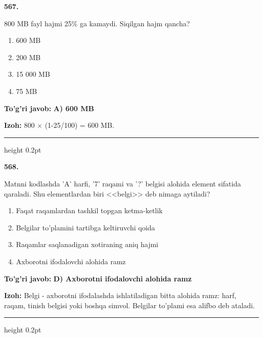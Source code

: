 \documentclass[10pt,a4paper,oneside]{article}
\begin{document}
\noindent\textbf{\color{ink}567.}
\par
800 MB fayl hajmi 25\% ga kamaydi. Siqilgan hajm qancha?
\begin{enumerate}[label=\Alph*),leftmargin=9mm]
\item 600 MB
\item 200 MB
\item 15 000 MB
\item 75 MB
\end{enumerate}
\begin{tcolorbox}[enhanced,breakable,colback=teal!4,colframe=teal!50!black,boxrule=0.5pt,arc=1.1mm,left=3mm,right=3mm,top=1.7mm,bottom=1.7mm,before skip=2mm,after skip=2mm]
\textbf{\color{teal}To'g'ri javob:} \textbf{A) 600 MB}
\par\smallskip
\textbf{Izoh:} 800 \ensuremath{\times} (1-25/100) = 600 MB.
\end{tcolorbox}
\vspace{2mm}\hrule height 0.2pt \vspace{3mm}

\noindent\textbf{\color{ink}568.}
\par
Matnni kodlashda 'A' harfi, '7' raqami va '?' belgisi alohida element sifatida qaraladi. Shu elementlardan biri <<belgi>> deb nimaga aytiladi?
\begin{enumerate}[label=\Alph*),leftmargin=9mm]
\item Faqat raqamlardan tashkil topgan ketma-ketlik
\item Belgilar to'plamini tartibga keltiruvchi qoida
\item Raqamlar saqlanadigan xotiraning aniq hajmi
\item Axborotni ifodalovchi alohida ramz
\end{enumerate}
\begin{tcolorbox}[enhanced,breakable,colback=teal!4,colframe=teal!50!black,boxrule=0.5pt,arc=1.1mm,left=3mm,right=3mm,top=1.7mm,bottom=1.7mm,before skip=2mm,after skip=2mm]
\textbf{\color{teal}To'g'ri javob:} \textbf{D) Axborotni ifodalovchi alohida ramz}
\par\smallskip
\textbf{Izoh:} Belgi - axborotni ifodalashda ishlatiladigan bitta alohida ramz: harf, raqam, tinish belgisi yoki boshqa simvol. Belgilar to'plami esa alifbo deb ataladi.
\end{tcolorbox}
\vspace{2mm}\hrule height 0.2pt \vspace{3mm}
\end{document}
